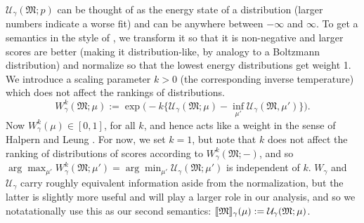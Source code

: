 \documentclass{article}
\theoremstyle{plain}
\theoremstyle{definition}
\theoremstyle{remark}
\DeclarePairedDelimiter{\bbr}{\llbracket}{\rrbracket}
\newcommand{\dg}[1]{\mathfrak{#1}}
\numberwithin{equation}{section}
\begin{document}
{$\mathcal U_\gamma(\dg M; p)$ can be thought of as the energy state of
        a distribution (larger numbers indicate a worse fit) and can
        be anywhere between $-\infty$ and $\infty$.
        To get a semantics in the style of \cite{halpern2015weighted},
        we transform it so that it is non-negative and larger scores
        are better (making it distribution-like, by analogy to a
        Boltzmann distribution) and normalize so that the lowest
        energy distributions get weight 1. We introduce a scaling
        parameter $k > 0$ (the corresponding inverse temperature)
       which does not affect the rankings of distributions. 
       \[ W^k_\gamma(\dg M; \mu) := \exp\Big(  -k \Big\{\mathcal U_{\gamma}(\dg M;\mu)- \inf_{\mu'} \mathcal U_\gamma(\dg M,\mu')\Big\} \Big).\]
Now 
$W^k_\gamma(\mu) \in  [0,1]$, for all $k$, and hence acts like a weight in the sense of  Halpern and Leung \citeyear{halpern2015weighted}.
For now, we set $k=1$, but note that $k$ does not affect the ranking of distributions of scores according to $W^k_\gamma(\dg M; -)$, and so $\arg\max_{\mu'} W^k_\gamma(\dg M; \mu')  = \arg\min_{\mu'} \mathcal U_\gamma(\dg M;\mu')$ is independent of $k$. 
%
$W_\gamma$ and $\mathcal U_\gamma$ carry roughly equivalent information aside from the normalization, but the latter is slightly more useful and will play a larger role in our analysis, and so we notatationally use this as our second semantics: $\bbr{\dg M}_\gamma(\mu) := \mathcal U_\gamma(\dg M ; \mu)$.
}
\end{document}
